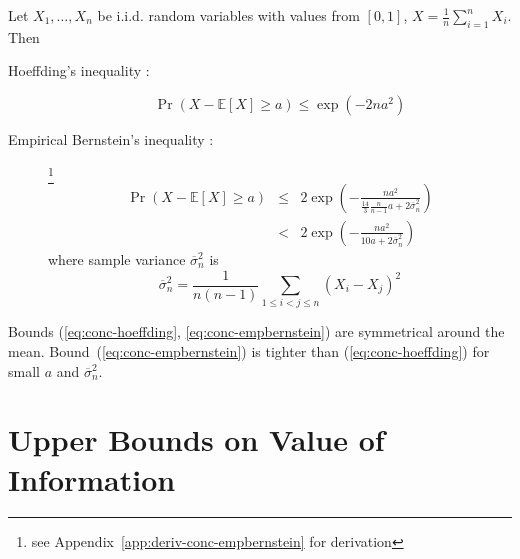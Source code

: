 \documentclass{article}
\newcommand {\IE} {\ensuremath {\mathbb{E}}}
\begin{document}
Let $X_1, \ldots, X_n$ be i.i.d. random variables with values from $[0,1]$,
$X=\frac 1 n \sum_{i=1}^n X_i$. Then 
\begin{description}
\item[Hoeffding's inequality \rm{\cite{Hoeffding.ineq}}:] 
\begin{equation}
\Pr(X-\IE[X] \ge a) \le \exp ( -2na^2)
\label{eq:conc-hoeffding}
\end{equation}
\item[Empirical Bernstein's inequality
  \rm{\cite{MaurerPontil.benrstein}}:]\footnote{see
    Appendix~\ref{app:deriv-conc-empbernstein} for derivation}
\begin{eqnarray}
\Pr(X-\IE[X] \ge a) &\le& 2\exp \left( - \frac {na^2} {\frac {14} {3}
                          \frac {n} {n-1}a+2\overline\sigma_n^2}\right)\nonumber\\
                    &<& 2\exp \left( - \frac {na^2} {10a+2\overline\sigma_n^2}\right)
\label{eq:conc-empbernstein}
\end{eqnarray}
where sample variance $\overline\sigma_n^2$ is
\begin{equation}
\overline\sigma_n^2=\frac 1 {n(n-1)} \sum_{1\le i < j\le n}(X_i-X_j)^2
\label{eq:sample-variance}
\end{equation}
\end{description}
Bounds (\ref{eq:conc-hoeffding}, \ref{eq:conc-empbernstein}) are symmetrical
around the mean. Bound~(\ref{eq:conc-empbernstein}) is tighter than
(\ref{eq:conc-hoeffding}) for small $a$ and $\overline\sigma_n^2$. 


\section{Upper Bounds on Value of Information}
\end{document}
